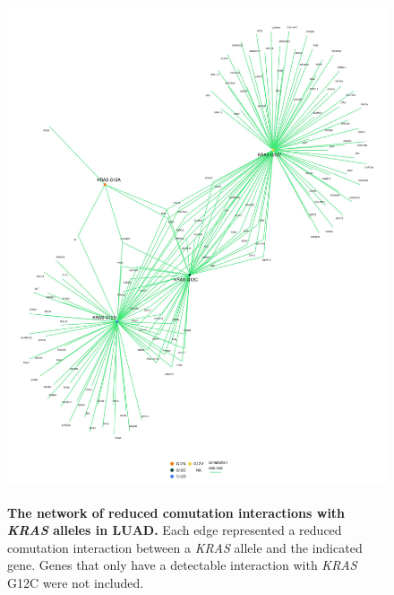 \documentclass[english, 12pt, letterpaper]{article}
\newcommand{\KRAS}{\emph{KRAS}}
\begin{document}
\begin{figure}[p]
\centering
\includegraphics[height=150mm]{figures/SuppFigure_08.jpeg}
\caption{
    \textbf{The network of reduced comutation interactions with \KRAS{} alleles in LUAD.} Each edge represented a reduced comutation interaction between a \KRAS{} allele and the indicated gene. Genes that only have a detectable interaction with \KRAS{} G12C were not included.
}
\label{sfig:luad_labeled-reduced-comutation}
\end{figure}
\end{document}
